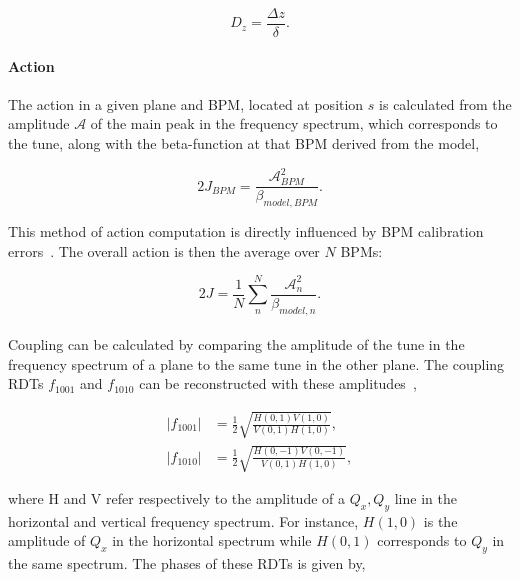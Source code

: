 \begin{equation}
    D_z = \frac{\Delta z}{\delta}.
\end{equation}



\paragraph{Action} 
The action in a given plane and BPM, located at position $s$ is calculated from the amplitude
$\mathcal{A}$ of the main peak in the frequency spectrum, which corresponds to the tune, along with
the beta-function at that BPM derived from the model,

\begin{equation}
    2J_{BPM} = \frac{\mathcal{A}_{BPM}^2}{\beta_{model,BPM}}.
\end{equation}

This method of action computation is directly influenced by BPM calibration
errors~\cite{garcia-tabares_valdivieso_optics-measurement-based_2020}. The overall action is then
the average over $N$ BPMs:

\begin{equation}
    2J = \frac{1}{N} \sum_n^N \frac{\mathcal{A}_n^2}{\beta_{model,n}}.
\end{equation}


\paragraph{}

Coupling can be calculated by comparing the amplitude of the tune in the frequency spectrum of a
plane to the same tune in the other plane. The coupling RDTs $f_{1001}$ and $f_{1010}$ can be
reconstructed with these amplitudes~\cite{franchi_computation_2010,tomas_cern_2010},

\begin{equation}
    \begin{aligned}
        |f_{1001}| &= \frac{1}{2} \sqrt{\frac{H(0,1)V(1,0)}{V(0,1)H(1,0)}}, \\
        |f_{1010}| &= \frac{1}{2} \sqrt{\frac{H(0,-1)V(0,-1)}{V(0,1)H(1,0)}},
    \end{aligned}
\end{equation}

where H and V refer respectively to the amplitude of a $Q_x, Q_y$ line in the horizontal and
vertical frequency spectrum. For instance, $H(1, 0)$ is the amplitude of $Q_x$ in the horizontal
spectrum while $H(0, 1)$ corresponds to $Q_y$ in the same spectrum. The phases of these RDTs is given
by,

